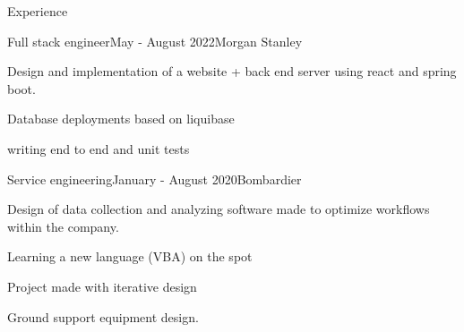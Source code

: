 \documentclass{resume} %
\begin{document}
	\begin{rSection}{Experience}
		\begin{rSubsection}{Full stack engineer}{May - August 2022}{Morgan Stanley}{}{}
			\item Design and implementation of a website + back end server using react and spring boot.
			\item Database deployments based on liquibase
			\item writing end to end and unit tests
		\end{rSubsection}
		\begin{rSubsection}{Service engineering}{January - August 2020}{Bombardier}{}{}
			\item Design of data collection and analyzing software made to optimize workflows within the company.
			\item Learning a new language (VBA) on the spot
			\item Project made with iterative design
			\item Ground support equipment design.
		\end{rSubsection}
		
		
		
	\end{rSection}
	
\end{document}
